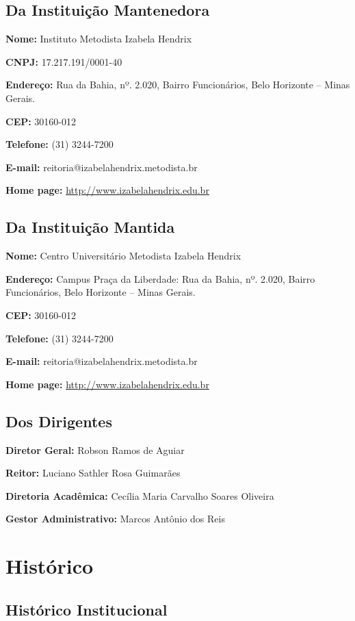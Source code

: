 \documentclass[a4paper, 12pt, openright, oneside, german, french, english, brazil]{abntex2}
\begin{document}
\section{Da Instituição Mantenedora}
\textbf{Nome:} Instituto Metodista Izabela Hendrix

\textbf{CNPJ:} 17.217.191/0001-40

\textbf{Endereço:} Rua da Bahia, nº. 2.020, Bairro Funcionários, Belo Horizonte – Minas Gerais.

\textbf{CEP:} 30160-012

\textbf{Telefone:} (31) 3244-7200

\textbf{E-mail:} reitoria@izabelahendrix.metodista.br

\textbf{Home page:} \url{http://www.izabelahendrix.edu.br}

\section{Da Instituição Mantida}
\textbf{Nome:} Centro Universitário Metodista Izabela Hendrix

\textbf{Endereço:} Campus Praça da Liberdade: Rua da Bahia, nº. 2.020, Bairro Funcionários, Belo Horizonte – Minas Gerais.

\textbf{CEP:} 30160-012

\textbf{Telefone:} (31) 3244-7200

\textbf{E-mail:} reitoria@izabelahendrix.metodista.br

\textbf{Home page:} \url{http://www.izabelahendrix.edu.br}

\section{Dos Dirigentes}

\textbf{Diretor Geral:} Robson Ramos de Aguiar

\textbf{Reitor:} Luciano Sathler Rosa Guimarães

\textbf{Diretoria Acadêmica:} Cecília Maria Carvalho Soares Oliveira

\textbf{Gestor Administrativo:} Marcos Antônio dos Reis


\chapter{Histórico}

\section{Histórico Institucional}
\end{document}
